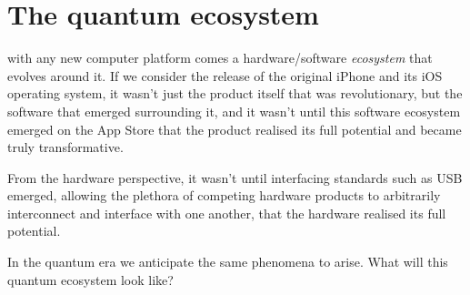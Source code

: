 %
%

\section{The quantum ecosystem}

\newline

 with any new computer platform comes a hardware/software \textit{ecosystem} that evolves around it. If we consider the release of the original iPhone and its iOS operating system, it wasn't just the product itself that was revolutionary, but the software that emerged surrounding it, and it wasn't until this software ecosystem emerged on the App Store that the product realised its full potential and became truly transformative.

From the hardware perspective, it wasn't until interfacing standards such as USB emerged, allowing the plethora of competing hardware products to arbitrarily interconnect and interface with one another, that the hardware realised its full potential.

In the quantum era we anticipate the same phenomena to arise. What will this quantum ecosystem look like?


